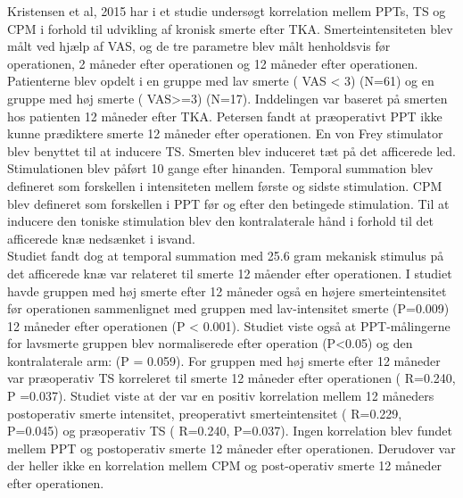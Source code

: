 Kristensen et al, 2015 har i et studie undersøgt korrelation mellem PPTs, TS og CPM i forhold til udvikling af kronisk smerte efter TKA. Smerteintensiteten blev målt ved hjælp af VAS, og de tre parametre blev målt henholdsvis før operationen, 2 måneder efter operationen og 12 måneder efter operationen. Patienterne blev opdelt i en gruppe med lav smerte ( VAS < 3) (N=61) og en  gruppe med høj smerte ( VAS>=3) (N=17). Inddelingen var baseret på smerten hos patienten 12 måneder efter TKA. Petersen fandt at præoperativt PPT ikke kunne prædiktere smerte 12 måneder efter operationen. En von Frey stimulator blev benyttet til at inducere TS. Smerten blev induceret tæt på det afficerede led. Stimulationen blev påført 10 gange efter hinanden. Temporal summation blev defineret som forskellen i intensiteten mellem første og sidste stimulation. CPM blev defineret som forskellen i PPT før og efter den betingede stimulation. Til at inducere den toniske stimulation blev den kontralaterale hånd i forhold til det afficerede knæ nedsænket i isvand.\\
Studiet fandt dog at temporal summation med 25.6 gram mekanisk stimulus på det afficerede knæ var relateret til smerte 12 måender efter operationen. I studiet havde gruppen med høj smerte efter 12 måneder også en højere smerteintensitet før operationen sammenlignet med gruppen med lav-intensitet smerte (P=0.009) 12 måneder efter operationen (P < 0.001). Studiet viste også at PPT-målingerne for lavsmerte gruppen blev normaliserede efter operation (P<0.05) og den kontralaterale arm: (P = 0.059). For gruppen med høj smerte efter 12 måneder var præoperativ TS korreleret til smerte 12 måneder efter operationen ( R=0.240, P =0.037).
Studiet viste at der var en positiv korrelation mellem 12 måneders postoperativ smerte intensitet, preoperativt smerteintensitet ( R=0.229, P=0.045) og præoperativ TS ( R=0.240, P=0.037). Ingen korrelation blev fundet mellem PPT og postoperativ smerte 12 måneder efter operationen. Derudover var der heller ikke en korrelation mellem CPM og post-operativ smerte 12 måneder efter operationen.


